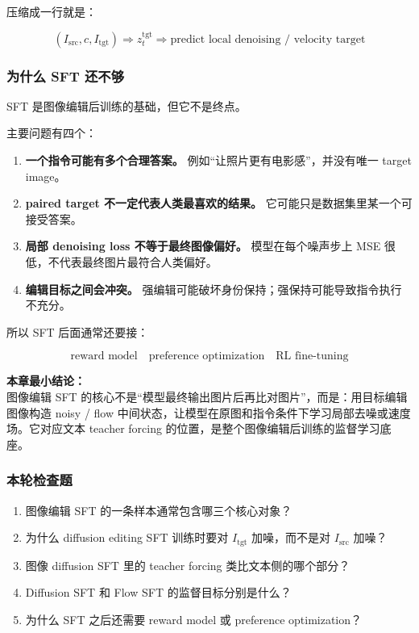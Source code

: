 压缩成一行就是：

\[
\left(
I_\text{src},
c,
I_\text{tgt}
\right)
\Rightarrow
z_t^\text{tgt}
\Rightarrow
\text{predict local denoising / velocity target}
\]

\subsubsection{为什么 SFT 还不够}

SFT 是图像编辑后训练的基础，但它不是终点。

主要问题有四个：

\begin{enumerate}[leftmargin=1.5em]
  \item \textbf{一个指令可能有多个合理答案。} 例如“让照片更有电影感”，并没有唯一 target image。
  \item \textbf{paired target 不一定代表人类最喜欢的结果。} 它可能只是数据集里某一个可接受答案。
  \item \textbf{局部 denoising loss 不等于最终图像偏好。} 模型在每个噪声步上 MSE 很低，不代表最终图片最符合人类偏好。
  \item \textbf{编辑目标之间会冲突。} 强编辑可能破坏身份保持；强保持可能导致指令执行不充分。
\end{enumerate}

所以 SFT 后面通常还要接：

\[
\text{reward model}
\quad
\text{preference optimization}
\quad
\text{RL fine-tuning}
\]

\begin{summarybox}
\textbf{本章最小结论：}\\
图像编辑 SFT 的核心不是“模型最终输出图片后再比对图片”，而是：用目标编辑图像构造 noisy / flow 中间状态，让模型在原图和指令条件下学习局部去噪或速度场。它对应文本 teacher forcing 的位置，是整个图像编辑后训练的监督学习底座。
\end{summarybox}

\subsubsection{本轮检查题}

\begin{enumerate}[leftmargin=1.5em]
  \item 图像编辑 SFT 的一条样本通常包含哪三个核心对象？
  \item 为什么 diffusion editing SFT 训练时要对 $I_\text{tgt}$ 加噪，而不是对 $I_\text{src}$ 加噪？
  \item 图像 diffusion SFT 里的 teacher forcing 类比文本侧的哪个部分？
  \item Diffusion SFT 和 Flow SFT 的监督目标分别是什么？
  \item 为什么 SFT 之后还需要 reward model 或 preference optimization？
\end{enumerate}
